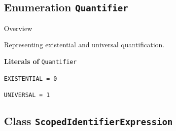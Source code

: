 \subsection{Enumeration \bfseries \texttt{Quantifier}\normalfont}
\label{cls:uppaal::expressions::Quantifier} 

	\begin{longdescription}
		\item[Overview] 		
				

	

		Representing existential and universal quantification.		
	
		\item[\textbf{Literals of} \texttt{Quantifier}] ~
		\begin{longdescription}
			
\item[\texttt{EXISTENTIAL = 0}] ~
\nopagebreak

\item[\texttt{UNIVERSAL = 1}] ~
\nopagebreak
		\end{longdescription}
	\end{longdescription}
	
	

\subsection{Class \bfseries \texttt{ScopedIdentifierExpression}\normalfont}
\label{cls:uppaal::expressions::ScopedIdentifierExpression} 
	

